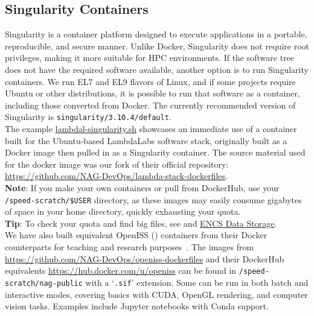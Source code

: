 \subsection{Singularity Containers}
\label{sect:singularity-containers}

Singularity is a container platform designed to execute applications in a portable, 
reproducible, and secure manner. Unlike Docker, Singularity does not require root privileges, 
making it more suitable for HPC environments. If the  software tree does not have 
the required software available, another option is to run Singularity containers. 
We run EL7 and EL9 flavors of Linux, and if some projects require Ubuntu or 
other distributions, it is possible to run that software as a container, 
including those converted from Docker. The currently recommended version of Singularity 
is \texttt{singularity/3.10.4/default}.\\

The example
\href{https://github.com/NAG-DevOps/speed-hpc/blob/master/src/lambdal-singularity.sh}{lambdal-singularity.sh}
showcases an immediate use of a container built for the Ubuntu-based LambdaLabs software stack, 
originally built as a Docker image then pulled in as a Singularity container. The source material
used for the docker image was our fork of their official repository: 
\url{https://github.com/NAG-DevOps/lambda-stack-dockerfiles}.\\

\noindent \textbf{Note}: If you make your own containers or pull from DockerHub,
use your \verb+/speed-scratch/$USER+ directory, as these images may easily 
consume gigabytes of space in your home directory, quickly exhausting your quota.\\

\noindent \textbf{Tip}: To check your quota and find big files, 
see  and
\href{https://www.concordia.ca/ginacody/aits/encs-data-storage.html}{ENCS Data Storage}.\\

We have also built equivalent OpenISS () containers from their Docker 
counterparts for teaching and research purposes~\cite{oi-containers-poster-siggraph2023}. 
The images from \url{https://github.com/NAG-DevOps/openiss-dockerfiles}
and their DockerHub equivalents \url{https://hub.docker.com/u/openiss} can be found in 
\verb+/speed-scratch/nag-public+ with a `\texttt{.sif}' extension.
Some can be run in both batch and interactive modes, covering basics with CUDA, OpenGL rendering, 
and computer vision tasks. Examples include Jupyter notebooks with Conda support.

